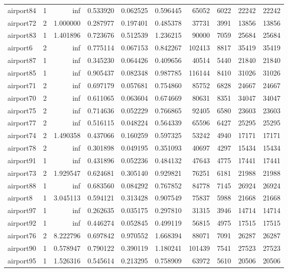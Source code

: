\begin{longtable}{|l|r|r|r|r|r|r|r|r|r|}
airport84 & 1 & inf & 0.533920 & 0.062525 & 0.596445 & 65052 & 6022 & 22242 & 22242 \\
airport72 & 2 & 1.000000 & 0.287977 & 0.197401 & 0.485378 & 37731 & 3991 & 13856 & 13856 \\
airport83 & 1 & 1.401896 & 0.723676 & 0.512539 & 1.236215 & 90000 & 7059 & 25684 & 25684 \\
airport6 & 2 & inf & 0.775114 & 0.067153 & 0.842267 & 102413 & 8817 & 35419 & 35419 \\
airport87 & 1 & inf & 0.345230 & 0.064426 & 0.409656 & 40514 & 5440 & 21840 & 21840 \\
airport85 & 1 & inf & 0.905437 & 0.082348 & 0.987785 & 116144 & 8410 & 31026 & 31026 \\
airport71 & 2 & inf & 0.697179 & 0.057681 & 0.754860 & 85752 & 6828 & 24667 & 24667 \\
airport70 & 2 & inf & 0.611065 & 0.063604 & 0.674669 & 80631 & 8351 & 34047 & 34047 \\
airport75 & 2 & inf & 0.714636 & 0.052229 & 0.766865 & 92405 & 6580 & 23603 & 23603 \\
airport77 & 2 & inf & 0.516115 & 0.048224 & 0.564339 & 65596 & 6427 & 25295 & 25295 \\
airport74 & 2 & 1.490358 & 0.437066 & 0.160259 & 0.597325 & 53242 & 4940 & 17171 & 17171 \\
airport78 & 2 & inf & 0.301898 & 0.049195 & 0.351093 & 40697 & 4297 & 15434 & 15434 \\
airport91 & 1 & inf & 0.431896 & 0.052236 & 0.484132 & 47643 & 4775 & 17441 & 17441 \\
airport73 & 2 & 1.929547 & 0.624681 & 0.305140 & 0.929821 & 76251 & 6181 & 21988 & 21988 \\
airport88 & 1 & inf & 0.683560 & 0.084292 & 0.767852 & 84778 & 7145 & 26924 & 26924 \\
airport8 & 1 & 3.045113 & 0.594121 & 0.313428 & 0.907549 & 75837 & 5988 & 21668 & 21668 \\
airport97 & 1 & inf & 0.262635 & 0.035175 & 0.297810 & 31315 & 3946 & 14714 & 14714 \\
airport92 & 1 & inf & 0.446274 & 0.052845 & 0.499119 & 56815 & 4975 & 17515 & 17515 \\
airport76 & 2 & 8.222796 & 0.697842 & 0.970552 & 1.668394 & 88071 & 7091 & 26287 & 26287 \\
airport90 & 1 & 0.578947 & 0.790122 & 0.390119 & 1.180241 & 101439 & 7541 & 27523 & 27523 \\
airport95 & 1 & 1.526316 & 0.545614 & 0.213295 & 0.758909 & 63972 & 5610 & 20506 & 20506 \\

\end{longtable}
